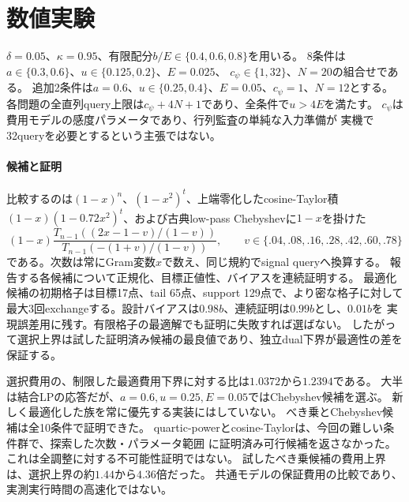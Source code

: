 \section{数値実験}\label{sec:results}
$\delta=0.05$、$\kappa=0.95$、有限配分$b/E\in\{0.4,0.6,0.8\}$を用いる。
8条件は$a\in\{0.3,0.6\}$、$u\in\{0.125,0.2\}$、$E=0.025$、
$c_\psi\in\{1,32\}$、$N=20$の組合せである。
追加2条件は$a=0.6$、$u\in\{0.25,0.4\}$、$E=0.05$、$c_\psi=1$、$N=12$とする。
各問題の全直列query上限は$c_\psi+4N+1$であり、全条件で$u>4E$を満たす。
$c_\psi$は費用モデルの感度パラメータであり、行列監査の単純な入力準備が
実機で32queryを必要とするという主張ではない。

\paragraph{候補と証明}
比較するのは$(1-x)^n$、$(1-x^2)^t$、上端零化したcosine-Taylor積
$(1-x)(1-0.72x^2)^t$、および古典low-pass Chebyshevに$1-x$を掛けた
\[
 (1-x)\frac{T_{n-1}((2x-1-v)/(1-v))}
                  {T_{n-1}(-(1+v)/(1-v))},\qquad
 v\in\{.04,.08,.16,.28,.42,.60,.78\}
\]
である。次数は常にGram変数$x$で数え、同じ規約でsignal queryへ換算する。
報告する各候補について正規化、目標正値性、バイアスを連続証明する。
最適化候補の初期格子は目標17点、tail 65点、support 129点で、より密な格子に対して
最大3回exchangeする。設計バイアスは$0.98b$、連続証明は$0.99b$とし、$0.01b$を
実現誤差用に残す。有限格子の最適解でも証明に失敗すれば選ばない。
したがって選択上界は試した証明済み候補の最良値であり、独立dual下界が最適性の差を
保証する。

\begin{table}[tb]
\centering\small

\caption{事前情報だけからの選択。$n$はGram次数、LPは証明済み最適化多項式、Cheb.は
試した格子内のChebyshev応答。Gapは$100(J^{\rm up}/\min J^{\rm lo}-1)$であり、
上端零化クラス・次数上限・有限配分格子に対する値で、全量子推定器に対する値ではない。}
\label{tab:selection}
\end{table}
選択費用の、制限した最適費用下界に対する比は$1.0372$から$1.2394$である。
大半は結合LPの応答だが、$a=0.6,u=0.25,E=0.05$ではChebyshev候補を選ぶ。
新しく最適化した族を常に優先する実装にはしていない。
べき乗とChebyshev候補は全10条件で証明できた。
quartic-powerとcosine-Taylorは、今回の難しい条件群で、探索した次数・パラメータ範囲
に証明済み可行候補を返さなかった。これは全調整に対する不可能性証明ではない。
試したべき乗候補の費用上界は、選択上界の約$1.44$から$4.36$倍だった。
共通モデルの保証費用の比較であり、実測実行時間の高速化ではない。

